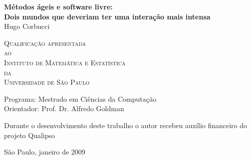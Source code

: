 \documentclass[12pt,twoside,letterpaper]{book}
\begin{document}
\frontmatter \onehalfspacing  %

\thispagestyle{empty}
\begin{center}
    \vspace*{2.3cm}
    \textbf{\Large{Métodos ágeis e software livre:\\
        Dois mundos que deveriam ter uma interação mais intensa}}\\
	
    \vspace*{1.2cm}
    \Large{Hugo Corbucci}
    
    \vskip 2cm
	\textsc{
	Qualificação apresentada\\[-0.25cm] 
	ao\\[-0.25cm]
	Instituto de Matemática e Estatística\\[-0.25cm]
	da\\[-0.25cm]
	Universidade de São Paulo}
    
    \vskip 1.5cm
    Programa: Mestrado em Ciências da Computação\\
    Orientador: Prof. Dr. Alfredo Goldman

    \vskip 1cm
	\normalsize{Durante o desenvolvimento deste trabalho o autor recebeu auxílio
	financeiro do projeto Qualipso}
	
    \vskip 0.5cm
    \normalsize{São Paulo, janeiro de 2009}
\end{center}

%
%
%
%
%	
%	  
\end{document}
